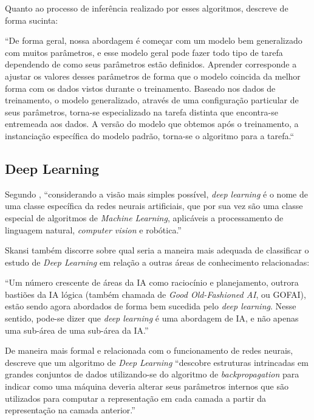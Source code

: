 Quanto ao processo de inferência realizado por esses algoritmos,  descreve de forma sucinta:

\begin{citacao}
“De forma geral, nossa abordagem é começar com um modelo bem generalizado com muitos parâmetros, e esse modelo geral pode fazer todo tipo de tarefa dependendo de como seus parâmetros estão definidos. Aprender corresponde a ajustar os valores desses parâmetros de forma que o modelo coincida da melhor forma com os dados vistos durante o treinamento. Baseado nos dados de treinamento, o modelo generalizado, através de uma configuração particular de seus parâmetros, torna-se especializado na tarefa distinta que encontra-se entremeada aos dados. A versão do modelo que obtemos após o treinamento, a instanciação específica do modelo padrão, torna-se o algoritmo para a tarefa.“
\end{citacao}

\subsection {Deep Learning}
Segundo , “considerando a visão mais simples possível, \textit{deep learning} é o nome de uma classe específica da redes neurais artificiais, que por sua vez são uma classe especial de algoritmos de \textit{Machine Learning}, aplicáveis a processamento de linguagem natural, \textit{computer vision} e robótica.”

Skansi também discorre sobre qual seria a maneira mais adequada de classificar o estudo de \textit{Deep Learning} em relação a outras áreas de conhecimento relacionadas:

\begin{citacao}
“Um número crescente de áreas da IA como raciocínio e planejamento, outrora bastiões da IA lógica (também chamada de \textit{Good Old-Fashioned AI}, ou GOFAI), estão sendo agora abordados de forma bem sucedida pelo \textit{deep learning}. Nesse sentido, pode-se dizer que \textit{deep learning} é uma abordagem de IA, e não apenas uma sub-área de uma sub-área da IA.”
\end{citacao}

De maneira mais formal e relacionada com o funcionamento de redes neurais,  descreve que um algoritmo de \textit{Deep Learning} “descobre estruturas intrincadas em grandes conjuntos de dados utilizando-se do algoritmo de \textit{backpropagation} para indicar como uma máquina deveria alterar seus parâmetros internos que são utilizados para computar a representação em cada camada a partir da representação na camada anterior.”

